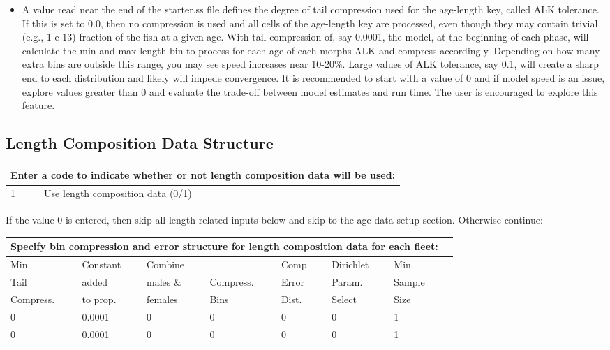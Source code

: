 \begin{itemize}
	\item  A value read near the end of the starter.ss file defines the degree of tail compression used for the age-length key, called ALK tolerance.  If this is set to 0.0, then no compression is used and all cells of the age-length key are processed, even though they may contain trivial (e.g., 1 e-13) fraction of the fish at a given age.  With tail compression of, say 0.0001, the model, at the beginning of each phase, will calculate the min and max length bin to process for each age of each morphs ALK and compress accordingly.  Depending on how many extra bins are outside this range, you may see speed increases near 10-20\%.  Large values of ALK tolerance, say 0.1, will create a sharp end to each distribution and likely will impede convergence.  It is recommended to start with a value of 0 and if model speed is an issue, explore values greater than 0 and evaluate the trade-off between model estimates and run time.  The user is encouraged to explore this feature.
\end{itemize}


\subsection{Length Composition Data Structure}
\begin{tabular}{p{2cm} p{13cm}}
		\multicolumn{2}{l}{Enter a code to indicate whether or not length composition data will be used:\Tstrut\Bstrut}\\
		\hline	
		1 & Use length composition data (0/1)\Tstrut\Bstrut\\
		\hline									  
\end{tabular}

If the value 0 is entered, then skip all length related inputs below and skip to the age data setup section.  Otherwise continue:
	
\hypertarget{Dirichlet}{}
\begin{tabular}{p{2cm} p{2cm} p{2cm} p{2cm} p{2cm} p{2cm} p{2cm} p{1.7cm}}
		\multicolumn{7}{l}{Specify bin compression and error structure for length composition data for each fleet:}\\
		\hline
		Min.      & Constant & Combine   &           & Comp. & Dirichlet & Min.\Tstrut\\
		Tail      & added    & males \&  & Compress. & Error & Param.    & Sample\\
		Compress. & to prop. & females   & Bins      & Dist. & Select    & Size\Bstrut\\
		\hline
		0 & 0.0001 & 0 & 0 & 0 & 0 & 1 \Tstrut\\
		0 & 0.0001 & 0 & 0 & 0 & 0 & 1 \Bstrut\\
		\hline
\end{tabular}

